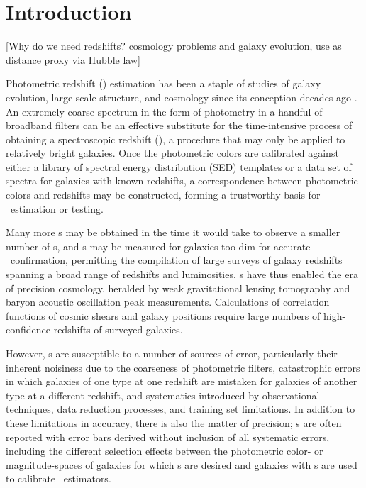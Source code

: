 \chapter*{Introduction}

[Why do we need redshifts? cosmology problems and galaxy evolution, use as distance proxy via Hubble law]

Photometric redshift (\pz) estimation has been a staple of studies of galaxy evolution, large-scale structure, and cosmology since its conception decades ago \citep{Baum1962}.  
An extremely coarse spectrum in the form of photometry in a handful of broadband filters can be an effective substitute for the time-intensive process of obtaining a spectroscopic redshift (\sz), a procedure that may only be applied to relatively bright galaxies.  
Once the photometric colors are calibrated against either a library of spectral energy distribution (SED) templates or a data set of spectra for galaxies with known redshifts, a correspondence between photometric colors and redshifts may be constructed, forming a trustworthy basis for \pz\ estimation or testing.

Many more \pz s may be obtained in the time it would take to observe a smaller number of \sz s, and \pz s may be measured for galaxies too dim for accurate \sz\ confirmation, permitting the compilation of large surveys of galaxy redshifts spanning a broad range of redshifts and luminosities.  
\Pz s have thus enabled the era of precision cosmology, heralded by weak gravitational lensing tomography and baryon acoustic oscillation peak measurements.  
Calculations of correlation functions of cosmic shears and galaxy positions require large numbers of high-confidence redshifts of surveyed galaxies.  

However, \pz s are susceptible to a number of sources of error, particularly their inherent noisiness due to the coarseness of photometric filters, catastrophic errors in which galaxies of one type at one redshift are mistaken for galaxies of another type at a different redshift, and systematics introduced by observational techniques, data reduction processes, and training set limitations.  
In addition to these limitations in accuracy, there is also the matter of precision; \pz s are often reported with error bars derived without inclusion of all systematic errors, including the different selection effects between the photometric color- or magnitude-spaces of galaxies for which \pz s are desired and galaxies with \sz s are used to calibrate \pz\ estimators.

